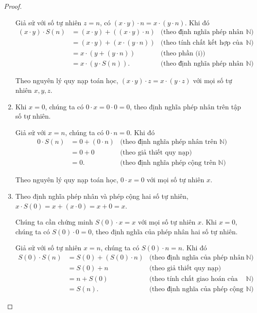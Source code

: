 \begin{proof}
\begin{enumerate}[label={(\roman*)}]
		      Giả sử với số tự nhiên $z = n$, có $(x\cdot y)\cdot n = x\cdot (y\cdot n)$. Khi đó
		      \begin{align*}
			      (x\cdot y)\cdot S(n) & = (x\cdot y) + ((x\cdot y)\cdot n) & \text{(theo định nghĩa phép nhân trên $\mathbb{N}$)}            \\
			                           & = (x\cdot y) + (x\cdot (y\cdot n)) & \text{(theo tính chất kết hợp của phép nhân trên $\mathbb{N}$)} \\
			                           & = x\cdot (y + (y\cdot n))          & \text{(theo phần (i))}                                          \\
			                           & = x\cdot (y\cdot S(n)).            & \text{(theo định nghĩa phép nhân trên $\mathbb{N}$)}
		      \end{align*}

		      Theo nguyên lý quy nạp toán học, $(x\cdot y)\cdot z = x\cdot (y\cdot z)$ với mọi số tự nhiên $x, y, z$.
		\item Khi $x = 0$, chúng ta có $0\cdot x = 0\cdot 0 = 0$, theo định nghĩa phép nhân trên tập số tự nhiên.

		      Giả sử với $x = n$, chúng ta có $0\cdot n = 0$. Khi đó
		      \begin{align*}
			      0\cdot S(n) & = 0 + (0\cdot n) & \text{(theo định nghĩa phép nhân trên $\mathbb{N}$)} \\
			                  & = 0 + 0          & \text{(theo giả thiết quy nạp)}                      \\
			                  & = 0.             & \text{(theo định nghĩa phép cộng trên $\mathbb{N}$)}
		      \end{align*}

		      Theo nguyên lý quy nạp toán học, $0\cdot x = 0$ với mọi số tự nhiên $x$.
		\item Theo định nghĩa phép nhân và phép cộng hai số tự nhiên, $x\cdot S(0) = x + (x\cdot 0) = x + 0 = x$.

		      Chúng ta cần chứng minh $S(0)\cdot x = x$ với mọi số tự nhiên $x$. Khi $x = 0$, chúng ta có $S(0)\cdot 0 = 0$, theo định nghĩa của phép nhân hai số tự nhiên.

		      Giả sử với số tự nhiên $x = n$, chúng ta có $S(0)\cdot n = n$. Khi đó
		      \begin{align*}
			      S(0)\cdot S(n) & = S(0) + (S(0)\cdot n) & \text{(theo định nghĩa của phép nhân trên $\mathbb{N}$)}          \\
			                     & = S(0) + n             & \text{(theo giả thiết quy nạp)}                                   \\
			                     & = n + S(0)             & \text{(theo tính chất giao hoán của phép cộng trên $\mathbb{N}$)} \\
			                     & = S(n).                & \text{(theo định nghĩa của phép cộng trên $\mathbb{N}$)}
		      \end{align*}


\end{enumerate}
\end{proof}
